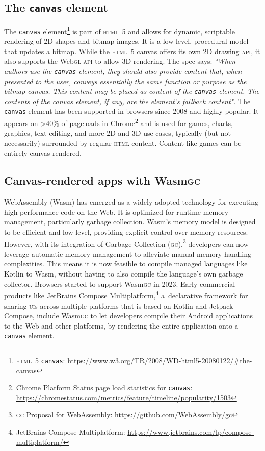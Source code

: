 \documentclass[sigconf]{acmart}
\begin{document}
\subsection{The \texttt{canvas} element}

The \texttt{canvas} element\footnote{\textsc{html}\ 5 \texttt{canvas}: \url{https://www.w3.org/TR/2008/WD-html5-20080122/#the-canvas}} is part of \textsc{html}\ 5 and allows for dynamic, scriptable rendering of 2D shapes and bitmap images. It is a low level, procedural model that updates a bitmap. While the \textsc{html}\ 5 canvas offers its own 2D drawing \textsc{api}, it also supports the Web\textsc{gl} \textsc{api} to allow 3D rendering. The spec says: \textit{"When authors use the \texttt{canvas} element, they should also provide content that, when presented to the user, conveys essentially the same function or purpose as the bitmap canvas. This content may be placed as content of the \texttt{canvas} element. The contents of the canvas element, if any, are the element's fallback content".} The \texttt{canvas} element has been supported in browsers since 2008 and highly popular. It appears on >40\% of pageloads in Chrome\footnote{Chrome Platform Status page load statistics for \texttt{canvas}: \url{https://chromestatus.com/metrics/feature/timeline/popularity/1503}} and is used for games, charts, graphics, text editing, and more 2D and 3D use cases, typically (but not necessarily) surrounded by regular \textsc{html} content. Content like games can be entirely canvas-rendered.

\subsection{Canvas-rendered apps with Wasm\textsc{gc}}

WebAssembly (Wasm) has emerged as a widely adopted technology for executing high-performance code on the Web. It is optimized for runtime memory management, particularly garbage collection. Wasm's memory model is designed to be efficient and low-level, providing explicit control over memory resources. However, with its integration of Garbage Collection (\textsc{gc}),\footnote{\textsc{gc} Proposal for WebAssembly: \url{https://github.com/WebAssembly/gc}} developers can now leverage automatic memory management to alleviate manual memory handling complexities. This means it is now feasible to compile managed languages like Kotlin to Wasm, without having to also compile the language's own garbage collector. Browsers started to support Wasm\textsc{gc} in 2023.  Early commercial products like JetBrains Compose Multiplatform,\footnote{JetBrains Compose Multiplatform: \url{https://www.jetbrains.com/lp/compose-multiplatform/}} a~declarative framework for sharing \textsc{ui}s across multiple platforms that is based on Kotlin and Jetpack Compose, include Wasm\textsc{gc} to let developers compile their Android applications to the Web and other platforms, by rendering the entire application onto a \texttt{canvas} element.
\end{document}
